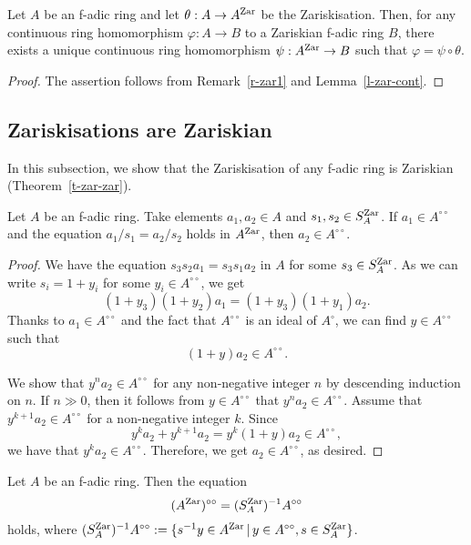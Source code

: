 \begin{thm}\label{t-zar-univ}
Let $A$ be an f-adic ring and 
let $\theta:A \to A^{{\operatorname{Zar}}}$ be the Zariskisation. 
Then, for any continuous ring homomorphism $\varphi:A \to B$ 
to a Zariskian f-adic ring $B$, 
there exists a unique continuous ring homomorphism 
$\psi:A^{{\operatorname{Zar}}} \to B$ such that $\varphi=\psi \circ \theta$. 
\end{thm}

\begin{proof}
The assertion follows from Remark~\ref{r-zar1} and Lemma~\ref{l-zar-cont}. 
\end{proof}



\subsection{Zariskisations are Zariskian}\label{ss-Zariskisation}

In this subsection, 
we show that the Zariskisation of any f-adic ring is Zariskian 
(Theorem~\ref{t-zar-zar}). 




\begin{lem}\label{l-frac-indep}
Let $A$ be an f-adic ring. 
Take elements $a_1, a_2 \in A$ and $s_1, s_2 \in S^{{\operatorname{Zar}}}_A$. 
If $a_1 \in A^{\circ\circ}$ and 
the equation $a_1/s_1=a_2/s_2$ holds in $A^{{\operatorname{Zar}}}$, 
then $a_2 \in A^{\circ\circ}$. 
\end{lem}

\begin{proof}
We have the equation $s_3s_2a_1=s_3s_1a_2$ in $A$ for some $s_3 \in S^{{\operatorname{Zar}}}_A$. 
As we can write $s_i=1+y_i$ for some $y_i \in A^{\circ\circ}$, 
we get 
$$(1+y_3)(1+y_2)a_1=(1+y_3)(1+y_1)a_2.$$
Thanks to $a_1 \in A^{\circ\circ}$ and the fact that $A^{\circ\circ}$ is an ideal of $A^{\circ}$, 
we can find $y \in A^{\circ\circ}$ such that 
$$(1+y)a_2 \in A^{\circ\circ}.$$




We show that $y^na_2 \in A^{\circ\circ}$ for any non-negative integer $n$ 
by descending induction on $n$. 
If $n \gg 0$, then it follows from $y \in A^{\circ\circ}$ that 
$y^na_2 \in A^{\circ\circ}$. 
Assume that $y^{k+1}a_2 \in A^{\circ\circ}$ for a non-negative integer $k$.  
Since 
$$y^ka_2+y^{k+1}a_2=y^k(1+y)a_2 \in A^{\circ\circ},$$
we have that $y^ka_2 \in A^{\circ\circ}$. 
Therefore, we get $a_2 \in A^{\circ\circ}$, as desired. 
\end{proof}

\begin{prop}\label{p-zariski-calcu}
Let $A$ be an f-adic ring. 
Then the equation 
$$(A^{{\operatorname{Zar}}})^{\circ\circ} = (S^{{\operatorname{Zar}}}_A)^{-1}A^{\circ\circ}$$
holds, where $(S^{{\operatorname{Zar}}}_A)^{-1}A^{\circ\circ}:=\{s^{-1}y \in A^{{\operatorname{Zar}}}\,|\,y \in A^{\circ\circ}, s \in S^{{\operatorname{Zar}}}_A\}$. 
\end{prop}

